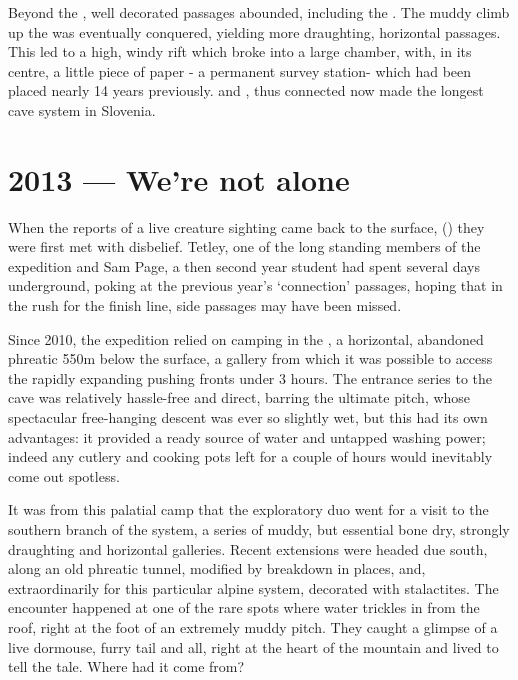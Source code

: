 Beyond the , well decorated passages abounded, including the . The muddy climb up the  was eventually conquered, yielding more draughting, horizontal passages. This led to a high, windy rift which broke into a large chamber, with, in its centre, a little piece of paper - a permanent survey station- which had been placed nearly 14 years previously.  and , thus connected now made the longest cave system in Slovenia.

\mydelimiter


\section{2013 --- We're not alone}

When the reports of a live creature sighting came back to the surface, () they were first met with disbelief. Tetley, one of the long standing members of the expedition and Sam Page, a then second year student had spent several days underground, poking at the previous year's `connection' passages, hoping that in the rush for the finish line, side passages may have been missed. 

Since 2010, the expedition relied on camping in the , a horizontal, abandoned phreatic 550m below the surface, a gallery from which it was possible to access the rapidly expanding pushing fronts under 3 hours. The entrance series to the cave was relatively hassle-free and direct, barring the ultimate pitch, whose spectacular free-hanging descent was ever so slightly wet, but this had its own advantages: it provided a ready source of water and untapped washing power; indeed any cutlery and cooking pots left for a couple of hours would inevitably come out spotless.


It was from this palatial camp that the exploratory duo went for a visit to the southern branch of the system, a series of muddy, but essential bone dry, strongly draughting and horizontal galleries. Recent extensions were headed due south, along an old phreatic tunnel, modified by breakdown in places, and, extraordinarily for this particular alpine system, decorated with stalactites. The encounter happened at one of the rare spots where water trickles in from the roof, right at the foot of an extremely muddy pitch. They caught a glimpse of a live dormouse, furry tail and all, right at the heart of the mountain and lived to tell the tale. Where had it come from? 

